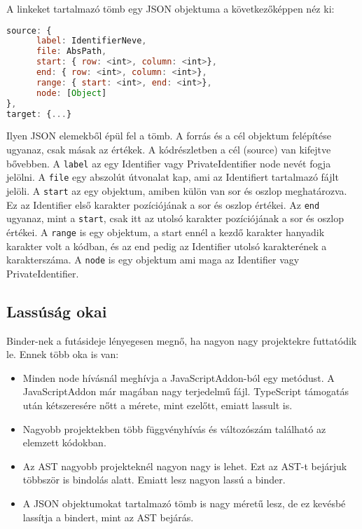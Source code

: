 A linkeket tartalmazó tömb egy JSON objektuma a következőképpen néz ki:

\begin{lstlisting}[caption={Binder JSON objektuma}, label={lst:binder_json_arg}, language={JavaScript}]
source: {
      label: IdentifierNeve,
      file: AbsPath,
      start: { row: <int>, column: <int>},
      end: { row: <int>, column: <int>},
      range: { start: <int>, end: <int>},
      node: [Object]
},
target: {...}
\end{lstlisting}

Ilyen JSON elemekből épül fel a tömb.
A forrás és a cél objektum felépítése ugyanaz, csak másak az értékek.
A kódrészletben a cél (source) van kifejtve bővebben.
A \texttt{label} az egy Identifier vagy PrivateIdentifier node nevét fogja jelölni.
A \texttt{file} egy abszolút útvonalat kap, ami az Identifiert tartalmazó fájlt jelöli.
A \texttt{start} az egy objektum, amiben külön van sor és oszlop meghatározva. Ez az Identifier első karakter pozíciójának a sor és oszlop értékei.
Az \texttt{end} ugyanaz, mint a \texttt{start}, csak itt az utolsó karakter pozíciójának a sor és oszlop értékei.
A \texttt{range} is egy objektum, a start ennél a kezdő karakter hanyadik karakter volt a kódban, és az end pedig az Identifier utolsó karakterének a karakterszáma.
A \texttt{node} is egy objektum ami maga az Identifier vagy PrivateIdentifier.

\subsection{Lassúság okai}

Binder-nek a futásideje lényegesen megnő, ha nagyon nagy projektekre futtatódik le.
Ennek több oka is van:

\begin{itemize}
      \item Minden node hívásnál meghívja a JavaScriptAddon-ból egy metódust.
      A JavaScriptAddon már magában nagy terjedelmű fájl. TypeScript támogatás után kétszeresére nőtt a mérete, mint ezelőtt, emiatt lassult is.
      \item Nagyobb projektekben több függvényhívás és változószám található az elemzett kódokban.
      \item Az AST nagyobb projekteknél nagyon nagy is lehet.
      Ezt az AST-t bejárjuk többször is bindolás alatt. Emiatt lesz nagyon lassú a binder.
      \item A JSON objektumokat tartalmazó tömb is nagy méretű lesz, de ez kevésbé lassítja a bindert, mint az AST bejárás.
\end{itemize}

